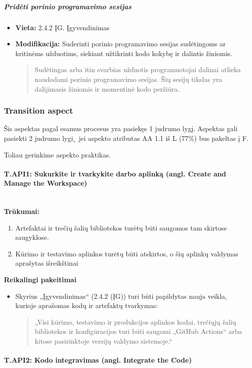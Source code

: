\documentclass{article}
\newcommand{\subsubsubsection}[1]{\paragraph{#1}\mbox{}\\}
\begin{document}
\subparagraph{Pridėti porinio programavimo sesijas}
\begin{itemize}
    \item \textbf{Vieta:} 2.4.2 ĮG. Įgyvendinimas
    \item \textbf{Modifikacija:} Suderinti porinio programavimo sesijas sudėtingoms ar kritinėms užduotims, siekiant užtikrinti kodo kokybę ir dalintis žiniomis.
    \begin{quote} Sudėtingas arba itin svarbias užduotis programuotojai dalinai atlieka naudodami porinio programavimo sesijas. Šių sesijų tikslas yra dalijimasis žiniomis ir momentinė kodo peržiūra.
    \end{quote}
\end{itemize}

\subsubsection{Transition aspect}

Šis aspektas pagal esamus procesus yra pasiekęs 1 judrumo lygį. Aspektas gali pasiekti 2 judrumo lygi˛ jei aspekto 
atributas AA 1.1 iš L (77\%) bus pakeltas į F.

Toliau gerinkime aspekto praktikas.

\subsubsubsection{T.API1: Sukurkite ir tvarkykite darbo aplinką (angl. Create and Manage the Workspace)}

\textbf{Trūkumai:}  
\begin{enumerate}
\item Artefaktai ir trečių šalių bibliotekos turėtų būti saugomos tam skirtose saugyklose. 
\item Kūrimo ir testavimo aplinkos turėtų būti atskirtos, o šių aplinkų valdymas aprašytas išreikštinai
\end{enumerate}

\textbf{Reikalingi pakeitimai }
\begin{itemize}
    \item Skyrius „Įgyvendinimas“ (2.4.2 (ĮG)) turi būti papildytas nauja veikla, kurioje aprašomas kodų ir artefaktų tvarkymas:
    \begin{quote}
    „Visi kūrimo, testavimo ir produkcijos aplinkos kodai, trečiųjų šalių bibliotekos ir konfigūracijos turi būti saugomi „GitHub Actions“ arba kitose pasirinktoje versijų valdymo sistemoje.“
    \end{quote}
\end{itemize}

\subsubsubsection{T.API2: Kodo integravimas (angl. Integrate the Code)}
\end{document}
